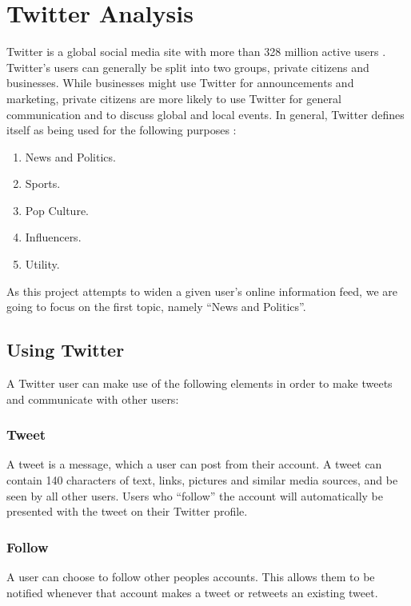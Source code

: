 \section{Twitter Analysis}\label{sec:twitter-analysis}
Twitter is a global social media site with more than 328 million active users
\citep{aboutTwitter}. Twitter's users can generally be split into two groups,
private citizens and businesses. While businesses might use Twitter for
announcements and marketing, private citizens are more likely to use Twitter for
general communication and to discuss global and local events. In general,
Twitter defines itself as being used for the following purposes
\citep{StartingTwitter}:

\begin{enumerate}    
  \item News and Politics.
  \item Sports.
  \item Pop Culture. 
  \item Influencers.
  \item Utility.
\end{enumerate}

As this project attempts to widen a given user's online information feed, we
are going to focus on the first topic, namely ``News and Politics''.

\subsection{Using Twitter}
A Twitter user can make use of the following elements \citep{StartingTwitter}
in order to make tweets and communicate with other users:

\subsubsection{Tweet}
A tweet is a message, which a user can post from their account. A tweet can
contain 140 characters\citep{StartingTwitter2} of text, links, pictures and
similar media sources, and be seen by all other users. Users who ``follow'' the
account will automatically be presented with the tweet on their Twitter profile.

\subsubsection{Follow}
A user can choose to follow other peoples accounts. This allows them to be
notified whenever that account makes a tweet or retweets an existing tweet.

